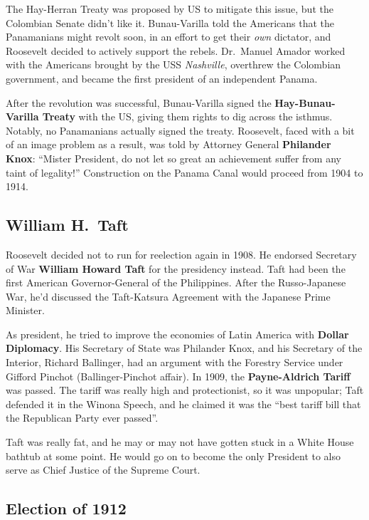The Hay-Herran Treaty was proposed by US to mitigate this issue, but the Colombian Senate didn't like it.
Bunau-Varilla told the Americans that the Panamanians might revolt soon,
in an effort to get their \textit{own} dictator,
and Roosevelt decided to actively support the rebels.
Dr.\ Manuel Amador worked with the Americans brought by the USS \textit{Nashville},
overthrew the Colombian government, and became the first president of an independent Panama.

After the revolution was successful,
Bunau-Varilla signed the \textbf{Hay-Bunau-Varilla Treaty} with the US, giving them rights to dig across the isthmus.
Notably, no Panamanians actually signed the treaty.
Roosevelt, faced with a bit of an image problem as a result,
was told by Attorney General \textbf{Philander Knox}:
``Mister President, do not let so great an achievement suffer from any taint of legality!''
Construction on the Panama Canal would proceed from 1904 to 1914.

\subsection*{William H.\ Taft}

Roosevelt decided not to run for reelection again in 1908.
He endorsed Secretary of War \textbf{William Howard Taft} for the presidency instead.
Taft had been the first American Governor-General of the Philippines.
After the Russo-Japanese War, he'd discussed the Taft-Katsura Agreement with the Japanese Prime Minister.

As president, he tried to improve the economies of Latin America with \textbf{Dollar Diplomacy}.
His Secretary of State was Philander Knox,
and his Secretary of the Interior, Richard Ballinger,
had an argument with the Forestry Service under Gifford Pinchot (Ballinger-Pinchot affair).
In 1909, the \textbf{Payne-Aldrich Tariff} was passed.
The tariff was really high and protectionist, so it was unpopular;
Taft defended it in the Winona Speech,
and he claimed it was the ``best tariff bill that the Republican Party ever passed''.

Taft was really fat, and he may or may not have gotten stuck in a White House bathtub at some point.
He would go on to become the only President to also serve as Chief Justice of the Supreme Court.

\subsection*{Election of 1912}

